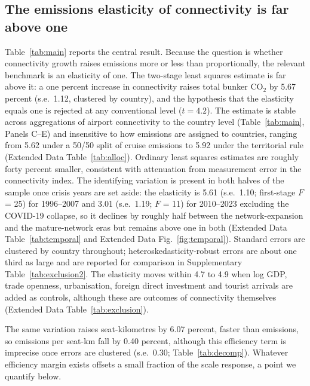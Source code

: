 \documentclass[12pt]{article}
\begin{document}
\subsection*{The emissions elasticity of connectivity is far above one}
Table~\ref{tab:main} reports the central result. Because the question is
whether connectivity growth raises emissions more or less than
proportionally, the relevant benchmark is an elasticity of one. The
two-stage least squares estimate is far above it: a one percent increase in
connectivity raises total bunker CO$_2$ by 5.67 percent (s.e.\ 1.12,
clustered by country), and the hypothesis that the elasticity equals one
is rejected at any conventional level ($t = 4.2$). The estimate is stable across aggregations of airport connectivity
to the country level (Table~\ref{tab:main}, Panels C--E) and insensitive
to how emissions are assigned to countries, ranging from 5.62 under a 50/50
split of cruise emissions to 5.92 under the territorial rule (Extended Data
Table~\ref{tab:alloc}). Ordinary least squares estimates are
roughly forty percent smaller, consistent with attenuation from measurement
error in the connectivity index. The identifying variation is present in
both halves of the sample once crisis years are set aside: the elasticity
is 5.61 (s.e.\ 1.10; first-stage $F$ = 25) for 1996--2007 and 3.01 (s.e.\
1.19; $F$ = 11) for 2010--2023 excluding the COVID-19 collapse, so it
declines by roughly half between the network-expansion and the
mature-network eras but remains above one in both (Extended Data
Table~\ref{tab:temporal} and Extended Data Fig.~\ref{fig:temporal}).
Standard errors are clustered by country throughout; heteroskedasticity-robust
errors are about one third as large and are reported for comparison in
Supplementary Table~\ref{tab:exclusion2}. The elasticity moves within 4.7
to 4.9 when log GDP, trade openness, urbanisation, foreign direct
investment and tourist arrivals are added as controls, although these are
outcomes of connectivity themselves (Extended Data
Table~\ref{tab:exclusion}).

The same variation raises seat-kilometres by 6.07 percent, faster than
emissions, so emissions per seat-km fall by 0.40 percent, although this
efficiency term is imprecise once errors are clustered (s.e.\ 0.30;
Table~\ref{tab:decomp}). Whatever efficiency margin exists offsets
a small fraction of the scale response, a point we quantify below.
\end{document}
